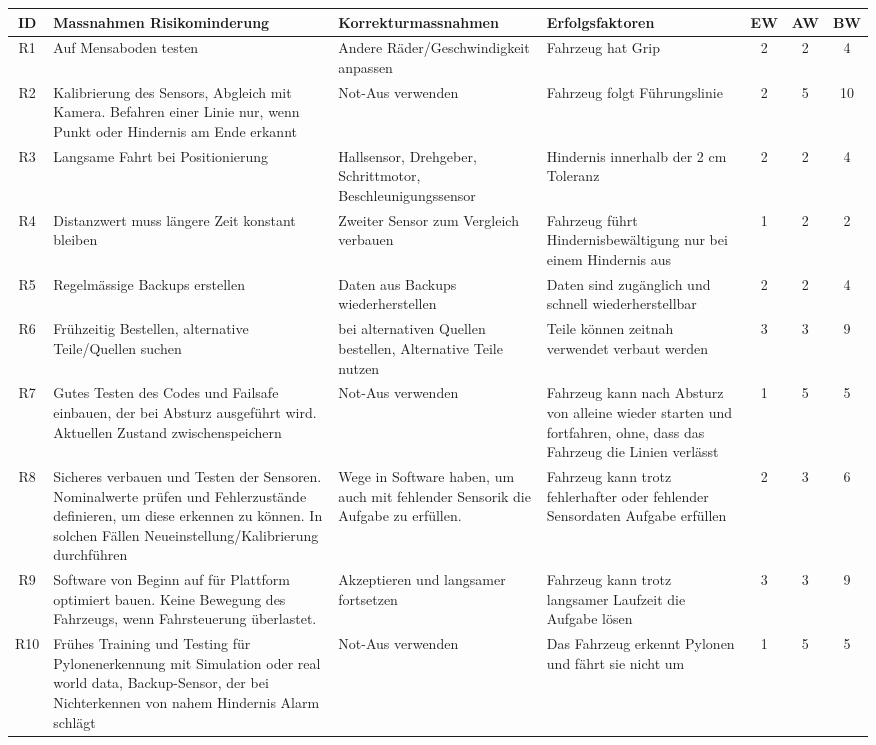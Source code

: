 \documentclass[../main.tex]{subfiles}
\begin{document}
\begin{landscape}
\begin{longtable}{|c|p{7cm}|p{5cm}|p{5cm}|c|c|c|}
\hline
\textbf{ID} & \textbf{Massnahmen Risikominderung} & \textbf{Korrekturmassnahmen} & \textbf{Erfolgsfaktoren} & \textbf{EW} & \textbf{AW} & \textbf{BW} \\ \hline
R1  & Auf Mensaboden testen & Andere Räder/Geschwindigkeit anpassen & Fahrzeug hat Grip & 2 & 2 & 4 \\ \hline
R2  & Kalibrierung des Sensors, Abgleich mit Kamera. Befahren einer Linie nur, wenn Punkt oder Hindernis am Ende erkannt & Not-Aus verwenden & Fahrzeug folgt Führungslinie & 2 & 5 & 10 \\ \hline
R3  & Langsame Fahrt bei Positionierung & Hallsensor, Drehgeber, Schrittmotor, Beschleunigungssensor & Hindernis innerhalb der 2 cm Toleranz & 2 & 2 & 4 \\ \hline
R4  & Distanzwert muss längere Zeit konstant bleiben & Zweiter Sensor zum Vergleich verbauen & Fahrzeug führt Hindernisbewältigung nur bei einem Hindernis aus & 1 & 2 & 2 \\ \hline
R5  & Regelmässige Backups erstellen & Daten aus Backups wiederherstellen & Daten sind zugänglich und schnell wiederherstellbar & 2 & 2 & 4 \\ \hline
R6  & Frühzeitig Bestellen, alternative Teile/Quellen suchen & bei alternativen Quellen bestellen, Alternative Teile nutzen & Teile können zeitnah verwendet verbaut werden & 3 & 3 & 9 \\ \hline
R7  & Gutes Testen des Codes und Failsafe einbauen, der bei Absturz ausgeführt wird. Aktuellen Zustand zwischenspeichern & Not-Aus verwenden & Fahrzeug kann nach Absturz von alleine wieder starten und fortfahren, ohne, dass das Fahrzeug die Linien verlässt & 1 & 5 & 5 \\ \hline
R8  & Sicheres verbauen und Testen der Sensoren. Nominalwerte prüfen und Fehlerzustände definieren, um diese erkennen zu können. In solchen Fällen Neueinstellung/Kalibrierung durchführen & Wege in Software haben, um auch mit fehlender Sensorik die Aufgabe zu erfüllen. & Fahrzeug kann trotz fehlerhafter oder fehlender Sensordaten Aufgabe erfüllen & 2 & 3 & 6 \\ \hline
R9  & Software von Beginn auf für Plattform optimiert bauen. Keine Bewegung des Fahrzeugs, wenn Fahrsteuerung überlastet. & Akzeptieren und langsamer fortsetzen & Fahrzeug kann trotz langsamer Laufzeit die Aufgabe lösen & 3 & 3 & 9 \\ \hline
R10 & Frühes Training und Testing für Pylonenerkennung mit Simulation oder real world data, Backup-Sensor, der bei Nichterkennen von nahem Hindernis Alarm schlägt & Not-Aus verwenden & Das Fahrzeug erkennt Pylonen und fährt sie nicht um & 1 & 5 & 5 \\ \hline

\end{longtable}
\end{landscape}
\end{document}
